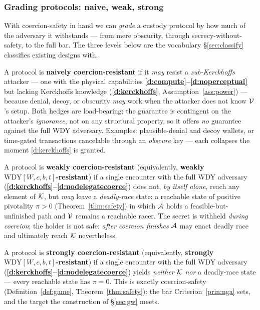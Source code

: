 \subsubsection*{Grading protocols: naive, weak, strong}

With coercion-safety in hand we can \emph{grade} a custody protocol by how much
of the adversary it withstands --- from mere obscurity, through
secrecy-without-safety, to the full bar. The three levels below are the vocabulary
\S\ref{sec:classify} classifies existing designs with.

\begin{definition}\label{def:naive-cr}
A protocol is \textbf{naively coercion-resistant} if it \emph{may} resist a
\emph{sub-Kerckhoffs} attacker --- one with the physical capabilities
\textbf{\ref{d:compute}--\ref{d:noperceptual}} but lacking Kerckhoffs knowledge (\textbf{\ref{d:kerckhoffs}},
Assumption~\ref{ass:power}) --- because denial, decoy, or obscurity \emph{may}
work when the attacker does not know $\mathcal{V}$'s setup. Both hedges are
load-bearing: the guarantee is contingent on the attacker's \emph{ignorance}, not
on any structural property, so it offers \emph{no} guarantee against the full WDY
adversary. Examples: plausible-denial and decoy wallets, or time-gated
transactions cancelable through an \emph{obscure} key --- each collapses the
moment \ref{d:kerckhoffs} is granted.
\end{definition}

\begin{definition}\label{def:weak-cr}
A protocol is \textbf{weakly coercion-resistant} (equivalently, \textbf{weakly
$\mathrm{WDY}[W,c,b,t]$-resistant}) if a single encounter with the full WDY
adversary (\textbf{\ref{d:kerckhoffs}--\ref{d:nodelegatecoerce}}) does not, \emph{by itself alone}, reach any
element of $\mathcal{K}$, but \emph{may} leave a \emph{deadly-race} state: a reachable state of
positive pivotality $\pi > 0$ (Theorem~\ref{thm:safety}) in which $\mathcal{A}$
holds a feasible-but-unfinished path and $\mathcal{V}$ remains a reachable racer. The
secret is withheld \emph{during coercion}; the holder is not safe: \emph{after coercion 
finishes} $\mathcal{A}$ may enact deadly race and ultimately reach $\mathcal{K}$ nevertheless.
\end{definition}

\begin{definition}\label{def:strong-cr}
A protocol is \textbf{strongly coercion-resistant} (equivalently, \textbf{strongly
$\mathrm{WDY}[W,c,b,t]$-resistant}) if a single encounter with the full WDY
adversary (\textbf{\ref{d:kerckhoffs}--\ref{d:nodelegatecoerce}}) yields \emph{neither} $\mathcal{K}$ \emph{nor} a deadly-race
state --- every reachable state has $\pi = 0$. This is exactly coercion-safety
(Definition~\ref{def:game}, Theorem~\ref{thm:safety}): the bar
Criterion~\ref{prin:nga} sets, and the target the construction of \S\ref{sec:gw}
meets.
\end{definition}

